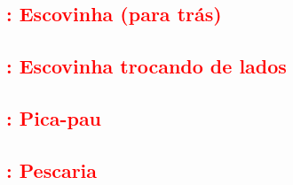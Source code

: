 \subsection{\textcolor{red}{\Variante: Escovinha (para trás)}}

\subsection{\textcolor{red}{\Variante: Escovinha trocando de lados}}

\subsection{\textcolor{red}{\Variante: Pica-pau}}

\subsection{\textcolor{red}{\Variante: Pescaria}}


